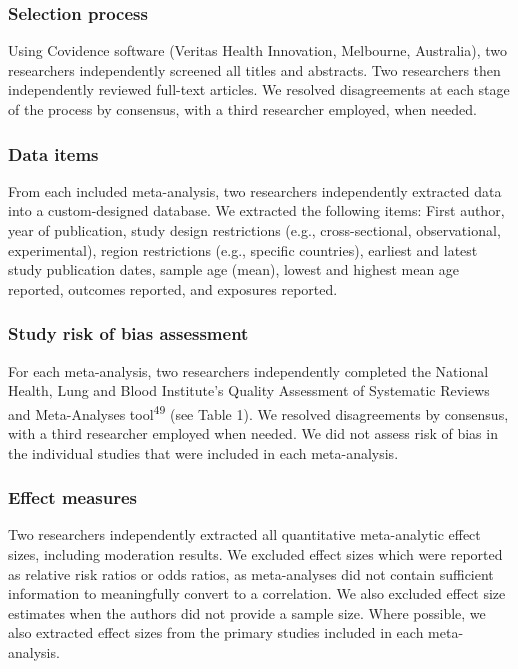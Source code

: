 \documentclass[
  english,
  man]{apa6}
\begin{document}
\hypertarget{selection-process}{%
\subsubsection{Selection process}\label{selection-process}}

Using Covidence software (Veritas Health Innovation, Melbourne, Australia), two researchers independently screened all titles and abstracts.
Two researchers then independently reviewed full-text articles.
We resolved disagreements at each stage of the process by consensus, with a third researcher employed, when needed.

\hypertarget{data-items}{%
\subsubsection{Data items}\label{data-items}}

From each included meta-analysis, two researchers independently extracted data into a custom-designed database.
We extracted the following items: First author, year of publication, study design restrictions (e.g., cross-sectional, observational, experimental), region restrictions (e.g., specific countries), earliest and latest study publication dates, sample age (mean), lowest and highest mean age reported, outcomes reported, and exposures reported.

\hypertarget{study-risk-of-bias-assessment}{%
\subsubsection{Study risk of bias assessment}\label{study-risk-of-bias-assessment}}

For each meta-analysis, two researchers independently completed the National Health, Lung and Blood Institute's Quality Assessment of Systematic Reviews and Meta-Analyses tool\textsuperscript{49} (see Table 1).
We resolved disagreements by consensus, with a third researcher employed when needed.
We did not assess risk of bias in the individual studies that were included in each meta-analysis.

\hypertarget{effect-measures}{%
\subsubsection{Effect measures}\label{effect-measures}}

Two researchers independently extracted all quantitative meta-analytic effect sizes, including moderation results.
We excluded effect sizes which were reported as relative risk ratios or odds ratios, as meta-analyses did not contain sufficient information to meaningfully convert to a correlation.
We also excluded effect size estimates when the authors did not provide a sample size.
Where possible, we also extracted effect sizes from the primary studies included in each meta-analysis.
\end{document}
